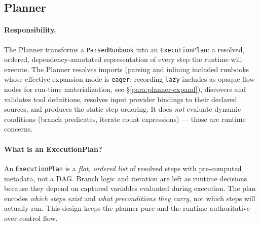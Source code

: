 \subsection{Planner}

\paragraph{Responsibility.}
The Planner transforms a \texttt{ParsedRunbook} into an \texttt{ExecutionPlan}: a resolved, ordered,
dependency-annotated representation of every step the runtime will execute. The Planner resolves imports
(parsing and inlining included runbooks whose effective expansion mode is \texttt{eager}; recording
\texttt{lazy} includes as opaque flow nodes for run-time materialization, see
\S\ref{para:planner-expand}), discovers and validates tool definitions, resolves
input provider bindings to their declared sources, and produces the static step ordering. It does
\emph{not} evaluate dynamic conditions (branch predicates, iterate count expressions) — those are
runtime concerns.

\paragraph{What is an ExecutionPlan?}
An \texttt{ExecutionPlan} is a \emph{flat, ordered list} of resolved steps with pre-computed metadata,
not a DAG. Branch logic and iteration are left as runtime decisions because they depend on captured
variables evaluated during execution. The plan encodes \emph{which steps exist} and \emph{what
preconditions they carry}, not which steps will actually run. This design keeps the planner pure and
the runtime authoritative over control flow.

